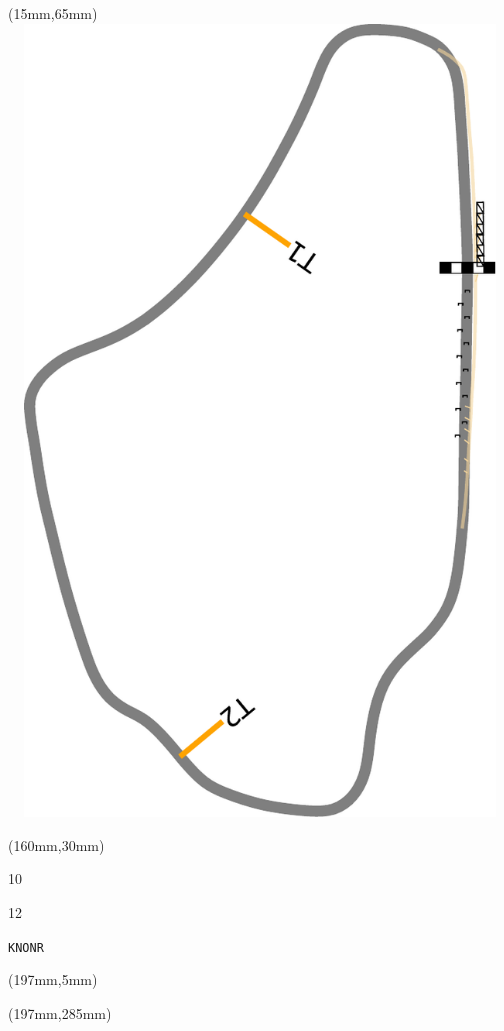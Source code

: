 \begin{textblock*}{185mm}(15mm,65mm)%
\centering
\mbox{\includegraphics[width=185mm,height=210mm,keepaspectratio]{PT/KNONR.pdf}}
\end{textblock*}
\begin{textblock*}{40mm}(160mm,30mm)%
\Large
\par{} 
\par10 
\par12 
\par\hfill\tiny\tt KNONR\\
\end{textblock*}
\begin{textblock*}{20mm}(197mm,5mm)%
\fbox{\thepage}
\label{KNONR}
\end{textblock*}
\begin{textblock*}{20mm}(197mm,285mm)%
\fbox{\thepage}
\end{textblock*}

